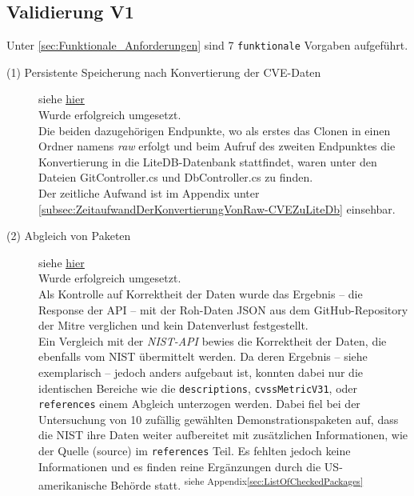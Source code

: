 \subsection{Validierung V1} \label{sec:Vali1}
    Unter \ref{sec:Funktionale_Anforderungen}  sind 7 \texttt{funktionale} Vorgaben aufgeführt.

    \begin{description}
        \item[(1) Persistente Speicherung nach Konvertierung der \ac{CVE}-Daten] siehe \hyperref[f:one]{\underline{hier}} \hfill \\
            Wurde erfolgreich umgesetzt.
            \\
            Die beiden dazugehörigen Endpunkte, wo als erstes das Clonen in einen Ordner namens \textit{raw} erfolgt und beim Aufruf des zweiten Endpunktes die Konvertierung in die LiteDB-Datenbank stattfindet, waren unter den Dateien GitController.cs und DbController.cs zu finden.
            \\
            Der zeitliche Aufwand ist im Appendix unter \ref{subsec:ZeitaufwandDerKonvertierungVonRaw-CVEZuLiteDb} einsehbar.
        \item[(2) Abgleich von Paketen] siehe \hyperref[f:two]{\underline{hier}} \hfill \\
            Wurde erfolgreich umgesetzt.
            \\
            Als Kontrolle auf Korrektheit der Daten wurde das Ergebnis -- die Response der \acs{API} -- mit der Roh-Daten \ac{JSON} aus dem GitHub-Repository der Mitre\textsuperscript{\cite{link:CveRepo}} verglichen und kein Datenverlust festgestellt.
            \\
            Ein Vergleich mit der \textit{NIST-API}\textsuperscript{\cite{link:NISTAPI}} bewies die Korrektheit der Daten, die ebenfalls vom \acs{NIST} übermittelt werden.
            Da deren Ergebnis -- siehe exemplarisch \cite{link:NISTapiAbfrageLiteDb} -- jedoch anders aufgebaut ist, konnten dabei nur die identischen Bereiche wie die \texttt{descriptions}, \texttt{cvssMetricV31}, oder \texttt{references} einem Abgleich unterzogen werden.
            Dabei fiel bei der Untersuchung von 10 zufällig gewählten Demonstrationspaketen auf, dass die \acs{NIST} ihre Daten weiter aufbereitet mit zusätzlichen Informationen, wie der Quelle (\glqq source\grqq) im \texttt{references} Teil.
            Es fehlten jedoch keine Informationen und es finden reine Ergänzungen durch die US-amerikanische Behörde statt. \textsuperscript{siehe Appendix\ref{sec:ListOfCheckedPackages}}

\end{description}
